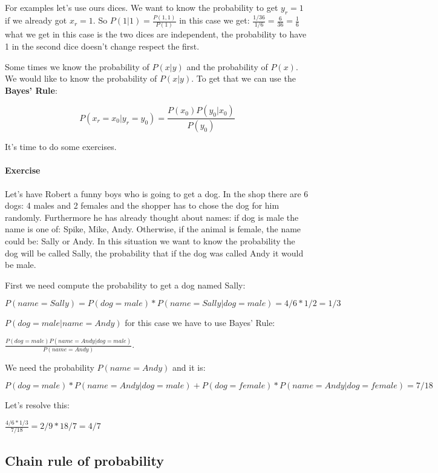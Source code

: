   
 For examples let's use ours dices. We want to know the probability to get $y_r = 1$ if we already got $x_r = 1$. 
 So $P(1 | 1) = \frac{P(1, 1)}{P(1)}$ in this case we get: $\frac{1/36}{1/6} = \frac{6}{36} = \frac{1}{6}$ what we get in this case is the two dices are independent, the probability to have 1 in the second dice doesn't change respect the first.  
 
 Some times we know the probability of $P(x|y)$ and the probability of $P(x)$. We would like to know the probability of $P(x|y)$. To get that we can use the \textbf{Bayes' Rule}: 

\begin{equation}
 P(x_r = x_0 | y_r = y_0) = \frac{P(x_0)P(y_0 | x_0)}{P(y_0)}
\end{equation} 

 It's time to do some exercises.
 \paragraph{Exercise}
 Let's have Robert a funny boys who is going to get a dog. In the shop there are 6 dogs: 4 males and 2 females and the shopper has to chose the dog for him randomly. Furthermore he has already thought about names: if dog is male the name is one of: Spike, Mike, Andy. Otherwise, if the animal is female, the name could be: Sally or Andy.
 In this situation we want to know the probability the dog will be called Sally, the probability that if the dog was called Andy it would be male.

First we need compute the probability to get a dog named Sally:

\[P(name = Sally) = P(dog = male)*P(name=Sally | dog=male)  = 4/6 * 1/2 = 1/3\]

$P(dog = male | name = Andy)$ for this case we have to use Bayes' Rule:

$\frac{P(dog=male)P(name = Andy | dog = male)}{P(name = Andy)}$.

We need the probability $P(name=Andy)$ and it is:

 $P(dog=male)*P(name=Andy | dog=male) + P(dog=female)*P(name=Andy | dog=female)  = 7/18$

 Let's resolve this:

$\frac{4/6 * 1/3}{7/18} = 2/9 * 18/7 = 4/7$

\subsection{Chain rule of probability}

